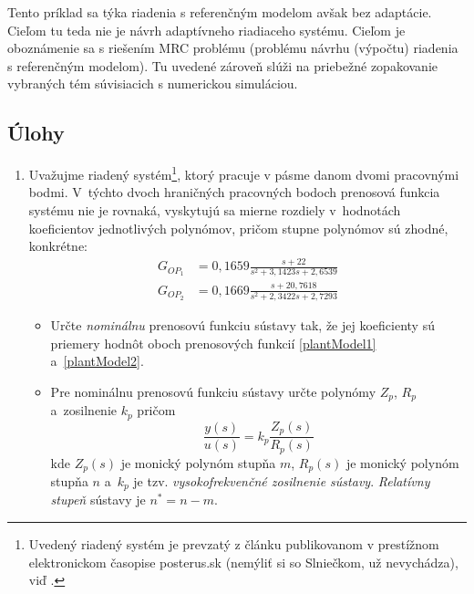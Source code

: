 \documentclass[a4paper, 10pt, ]{article}
\begin{document}
Tento príklad sa týka riadenia s referenčným modelom avšak bez adaptácie. Cieľom tu teda nie je návrh adaptívneho riadiaceho systému. Cieľom je oboznámenie sa s riešením MRC problému (problému návrhu (výpočtu) riadenia s referenčným modelom). Tu uvedené zároveň slúži na priebežné zopakovanie vybraných tém súvisiacich s numerickou simuláciou.







\subsection{Úlohy}


\begin{enumerate}[leftmargin=0pt, labelsep=4mm, itemsep=0pt]

    \item Uvažujme riadený systém\footnote{Uvedený riadený systém je prevzatý z článku publikovanom v prestížnom elektronickom časopise posterus.sk (nemýliť si so Slniečkom, už nevychádza), viď \cite{Tarnik2011}.}, ktorý pracuje v pásme danom dvomi pracovnými bodmi. V~týchto dvoch hraničných pracovných bodoch prenosová funkcia systému nie je rovnaká, vyskytujú sa mierne rozdiely v~hodnotách koeficientov jednotlivých polynómov, pričom stupne polynómov sú zhodné, konkrétne:
    \begin{align}
    	G_{OP_1} &= 0,1659 \frac{s + 22}{ s^2 + 3,1423 s + 2,6539} 	\label{plantModel1}\\
    	G_{OP_2} &= 0,1669 \frac{s + 20,7618}{s^2 + 2,3422s + 2,7293} \label{plantModel2}
    \end{align}
    \begin{itemize}[leftmargin=0pt, labelsep=4mm, itemsep=0pt]
    	\item Určte \emph{nominálnu} prenosovú funkciu sústavy tak, že jej koeficienty sú priemery hodnôt oboch prenosových funkcií \eqref{plantModel1} a~\eqref{plantModel2}.

    	\item Pre nominálnu prenosovú funkciu sústavy určte polynómy $Z_p$, $R_p$ a~zosilnenie $k_p$ pričom
    	\begin{equation} \label{C_PFsustavy_MRCp}
    	       \frac{y(s)}{u(s)} = k_p \frac{Z_p(s)}{R_p(s)}
        \end{equation}
        kde $Z_p(s)$ je monický  polynóm stupňa $m$, $R_p(s)$ je monický polynóm stupňa $n$ a~$k_p$ je tzv. \emph{vysokofrekvenčné zosilnenie sústavy}. \emph{Relatívny stupeň} sústavy je $n^* = n - m$.


\end{itemize}
\end{enumerate}
\end{document}

